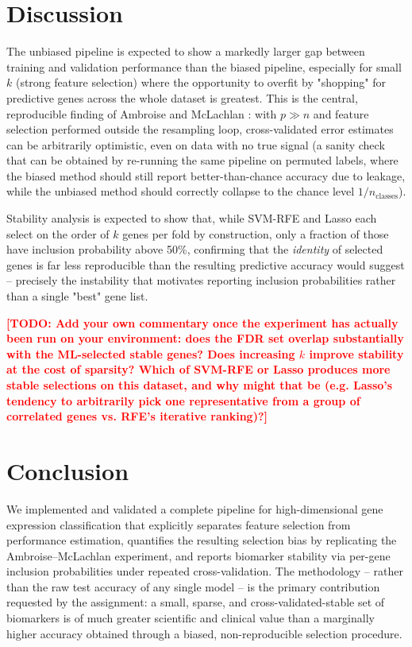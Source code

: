 \documentclass[11pt,a4paper]{article}
\newcommand{\todo}[1]{\textcolor{red}{\textbf{[TODO: #1]}}}
\begin{document}
\section{Discussion}
The unbiased pipeline is expected to show a markedly larger gap between training and validation performance than the biased pipeline, especially for small $k$ (strong feature selection) where the opportunity to overfit by "shopping" for predictive genes across the whole dataset is greatest.
This is the central, reproducible finding of Ambroise and McLachlan \cite{ambroise2002selection}: with $p \gg n$ and feature selection performed outside the resampling loop, cross-validated error estimates can be arbitrarily optimistic, even on data with no true signal (a sanity check that can be obtained by re-running the same pipeline on permuted labels, where the biased method should still report better-than-chance accuracy due to leakage, while the unbiased method should correctly collapse to the chance level $1/n_{\text{classes}}$).

Stability analysis is expected to show that, while SVM-RFE and Lasso each select on the order of $k$ genes per fold by construction, only a fraction of those have inclusion probability above 50\%, confirming that the \emph{identity} of selected genes is far less reproducible than the resulting predictive accuracy would suggest -- precisely the instability that motivates reporting inclusion probabilities rather than a single "best" gene list.

\todo{Add your own commentary once the experiment has actually been run on
your environment: does the FDR set overlap substantially with the
ML-selected stable genes? Does increasing $k$ improve stability at the cost
of sparsity? Which of SVM-RFE or Lasso produces more stable selections on
this dataset, and why might that be (e.g. Lasso's tendency to arbitrarily
pick one representative from a group of correlated genes vs. RFE's
iterative ranking)?}

\section{Conclusion}
We implemented and validated a complete pipeline for high-dimensional gene expression classification that explicitly separates feature selection from performance estimation, quantifies the resulting selection bias by replicating the Ambroise--McLachlan experiment, and reports biomarker stability via per-gene inclusion probabilities under repeated cross-validation.
The methodology -- rather than the raw test accuracy of any single model -- is the primary contribution requested by the assignment: a small, sparse, and cross-validated-stable set of biomarkers is of much greater scientific and clinical value than a marginally higher accuracy obtained through a biased, non-reproducible selection procedure.
\end{document}
